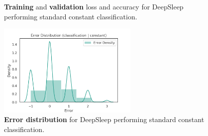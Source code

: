 \documentclass[11pt]{scrartcl}
\begin{document}
\begin{figure}[!hbt]
	\caption{\textcolor{viridis9}{\textbf{Training}} and \textcolor{viridis0}{\textbf{validation}} loss and accuracy for DeepSleep performing standard constant classification.}
\end{figure}

\begin{figure}[hbt]
	\centering
	\includegraphics[width=0.6\textwidth]{img/learning/original_physionet_sleepnet_classification_constant_none_unweighted_error_distribution.png}
	\caption{\textcolor{viridis5}{\textbf{Error distribution}} for DeepSleep performing standard constant classification.}
	\label{fig:original_physionet_sleepnet_classification_constant_none_unweighted_error_distribution}
\end{figure}
\end{document}
